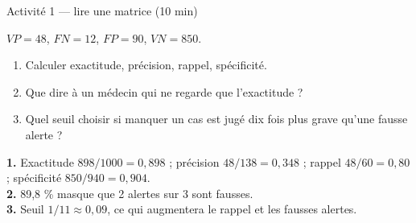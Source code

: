 \begin{frame}{Activité 1 --- lire une matrice (10 min)}
\begin{abox}
$VP=48$, $FN=12$, $FP=90$, $VN=850$.
\begin{enumerate}
  \item Calculer exactitude, précision, rappel, spécificité.
  \item Que dire à un médecin qui ne regarde que l'exactitude ?
  \item Quel seuil choisir si manquer un cas est jugé dix fois plus grave
        qu'une fausse alerte ?
\end{enumerate}
\end{abox}
\vspace{1mm}
\begin{solbox}[Réponses]
\textbf{1.} Exactitude $898/1000=0{,}898$ ; précision $48/138=0{,}348$ ;
rappel $48/60=0{,}80$ ; spécificité $850/940=0{,}904$.\\
\textbf{2.} 89,8 \% masque que 2 alertes sur 3 sont fausses.\\
\textbf{3.} Seuil $1/11\approx0{,}09$, ce qui augmentera le rappel et les fausses alertes.
\end{solbox}
\end{frame}

